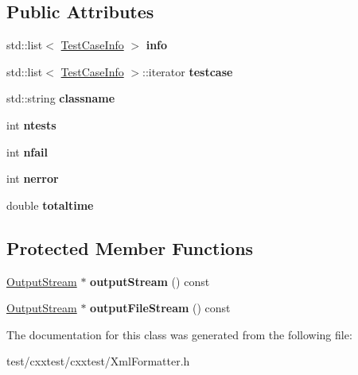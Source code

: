 \subsection*{Public Attributes}
\begin{DoxyCompactItemize}
\item 
\hypertarget{classCxxTest_1_1XmlFormatter_aad8b76664e764adf37d174bf26858c89}{std\-::list$<$ \hyperlink{classCxxTest_1_1TestCaseInfo}{Test\-Case\-Info} $>$ {\bfseries info}}\label{classCxxTest_1_1XmlFormatter_aad8b76664e764adf37d174bf26858c89}

\item 
\hypertarget{classCxxTest_1_1XmlFormatter_aa9e4edde1396847736120cc4fa890de0}{std\-::list$<$ \hyperlink{classCxxTest_1_1TestCaseInfo}{Test\-Case\-Info} $>$\-::iterator {\bfseries testcase}}\label{classCxxTest_1_1XmlFormatter_aa9e4edde1396847736120cc4fa890de0}

\item 
\hypertarget{classCxxTest_1_1XmlFormatter_a104d9388c3aea42d6c47858050357c9c}{std\-::string {\bfseries classname}}\label{classCxxTest_1_1XmlFormatter_a104d9388c3aea42d6c47858050357c9c}

\item 
\hypertarget{classCxxTest_1_1XmlFormatter_a842f812787639a6945fb5f4d1d8ad090}{int {\bfseries ntests}}\label{classCxxTest_1_1XmlFormatter_a842f812787639a6945fb5f4d1d8ad090}

\item 
\hypertarget{classCxxTest_1_1XmlFormatter_a7990eb5e0672f34db0a89f75b6ecbf36}{int {\bfseries nfail}}\label{classCxxTest_1_1XmlFormatter_a7990eb5e0672f34db0a89f75b6ecbf36}

\item 
\hypertarget{classCxxTest_1_1XmlFormatter_a1912066ac7d54972c7a4579f9146f819}{int {\bfseries nerror}}\label{classCxxTest_1_1XmlFormatter_a1912066ac7d54972c7a4579f9146f819}

\item 
\hypertarget{classCxxTest_1_1XmlFormatter_a2bc9f7299c0804d501cbc2d5e56c7dec}{double {\bfseries totaltime}}\label{classCxxTest_1_1XmlFormatter_a2bc9f7299c0804d501cbc2d5e56c7dec}

\end{DoxyCompactItemize}
\subsection*{Protected Member Functions}
\begin{DoxyCompactItemize}
\item 
\hypertarget{classCxxTest_1_1XmlFormatter_a299fc390207b9132e9f3a22fca44cbd4}{\hyperlink{classCxxTest_1_1OutputStream}{Output\-Stream} $\ast$ {\bfseries output\-Stream} () const }\label{classCxxTest_1_1XmlFormatter_a299fc390207b9132e9f3a22fca44cbd4}

\item 
\hypertarget{classCxxTest_1_1XmlFormatter_acb03af4a1ca6ccf682d6092f37788209}{\hyperlink{classCxxTest_1_1OutputStream}{Output\-Stream} $\ast$ {\bfseries output\-File\-Stream} () const }\label{classCxxTest_1_1XmlFormatter_acb03af4a1ca6ccf682d6092f37788209}

\end{DoxyCompactItemize}


The documentation for this class was generated from the following file\-:\begin{DoxyCompactItemize}
\item 
test/cxxtest/cxxtest/Xml\-Formatter.\-h\end{DoxyCompactItemize}
